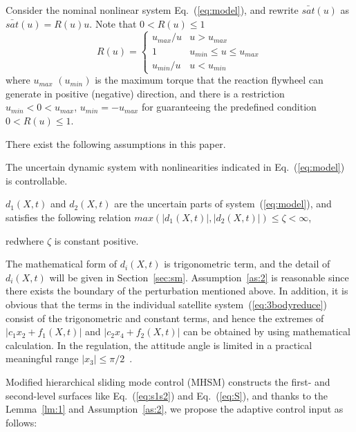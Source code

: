 Consider the nominal nonlinear system Eq.~(\ref{eq:model}), and rewrite $\bar{sat}(u)$ as $\bar{sat}(u) = R(u)u$. Note that $0 < R(u) \le 1$
\begin{equation}
R(u) =\begin{cases}
u_{max}/u   & u > u_{max}\\
1           & u_{min} \le u \le u_{max}\\
u_{min}/u   & u < u_{min}
\end{cases}
\end{equation}
where $u_{max}$ $(u_{min})$ is the maximum torque that the reaction flywheel can generate in positive (negative) direction, and there is a restriction $u_{min}<0<u_{max}$, $u_{min}=-u_{max}$ for guaranteeing the predefined condition $0<R(u)\le 1$.\par
There exist the following assumptions in this paper.
\begin{assumption}
The uncertain dynamic system with nonlinearities indicated in Eq.~(\ref{eq:model}) is controllable.\label{as:1}
\end{assumption}
\begin{assumption}
$d_1(X,t)$ and $d_2(X,t)$ are the uncertain parts of system~(\ref{eq:model}), and satisfies the following relation $max(\vert d_1(X,t)\vert,\vert d_2(X,t)\vert) \le \zeta <\infty$, \begin{color}{red}where $\zeta$ is constant positive.\end{color}\label{as:2}
\end{assumption}
\begin{remark}
The mathematical form of $d_i(X,t)$ is trigonometric term, and the detail of $d_i(X,t)$ will be given in Section~\ref{sec:sm}. Assumption~\ref{as:2} is reasonable since there exists the boundary of the perturbation mentioned above. In addition, it is obvious that the terms in the individual satellite system~(\ref{eq:3bodyreduce}) consist of the trigonometric and constant terms, and hence the extremes of $\vert c_1x_2+f_1(X,t)\vert$ and $\vert c_2x_4+f_2(X,t)\vert$ can be obtained by using mathematical calculation. In the regulation, the attitude angle is limited in a practical meaningful range $\vert x_3\vert\le\pi/2$~\cite{chung2008propellant2}.
\end{remark}\par
Modified hierarchical sliding mode control (MHSM) constructs the first- and second-level surfaces like Eq.~(\ref{eq:s1s2}) and Eq.~(\ref{eq:S}), and thanks to the Lemma~\ref{lm:1} and Assumption~\ref{as:2}, we propose the adaptive control input as follows:
